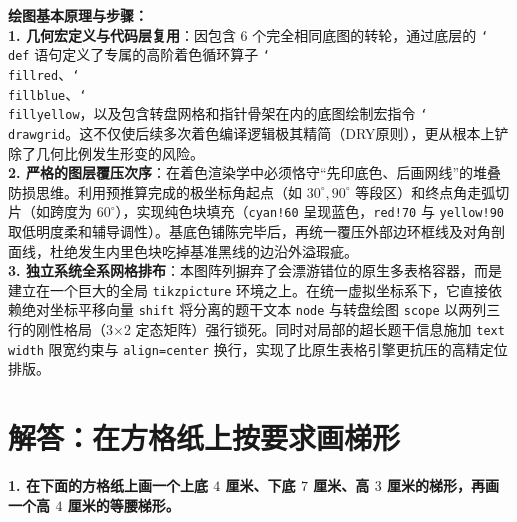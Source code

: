 \documentclass[12pt, a4paper]{ctexrep}
\begin{document}
\vspace{0.6cm}

{\small\color{blue!70!black}
\textbf{绘图基本原理与步骤：}\\
\textbf{1. 几何宏定义与代码层复用}：因包含 $6$ 个完全相同底图的转轮，通过底层的 \texttt{\char`\\def} 语句定义了专属的高阶着色循环算子 \texttt{\char`\\fillred}、\texttt{\char`\\fillblue}、\texttt{\char`\\fillyellow}，以及包含转盘网格和指针骨架在内的底图绘制宏指令 \texttt{\char`\\drawgrid}。这不仅使后续多次着色编译逻辑极其精简（DRY原则），更从根本上铲除了几何比例发生形变的风险。\\
\textbf{2. 严格的图层覆压次序}：在着色渲染学中必须恪守“先印底色、后画网线”的堆叠防损思维。利用预推算完成的极坐标角起点（如 $30^\circ, 90^\circ$ 等段区）和终点角走弧切片（如跨度为 $60^\circ$），实现纯色块填充（\texttt{cyan!60} 呈现蓝色，\texttt{red!70} 与 \texttt{yellow!90} 取低明度柔和辅导调性）。基底色铺陈完毕后，再统一覆压外部边环框线及对角剖面线，杜绝发生内里色块吃掉基准黑线的边沿外溢瑕疵。\\
\textbf{3. 独立系统全系网格排布}：本图阵列摒弃了会漂游错位的原生多表格容器，而是建立在一个巨大的全局 \texttt{tikzpicture} 环境之上。在统一虚拟坐标系下，它直接依赖绝对坐标平移向量 \texttt{shift} 将分离的题干文本 \texttt{node} 与转盘绘图 \texttt{scope} 以两列三行的刚性格局（3$\times$2 定态矩阵）强行锁死。同时对局部的超长题干信息施加 \texttt{text width} 限宽约束与 \texttt{align=center} 换行，实现了比原生表格引擎更抗压的高精定位排版。
}


\newpage

\section{解答：在方格纸上按要求画梯形}

\vspace{0.4cm}

\noindent\textbf{1. 在下面的方格纸上画一个上底 $4$ 厘米、下底 $7$ 厘米、高 $3$ 厘米的梯形，再画一个高 $4$ 厘米的等腰梯形。}

\vspace{0.8cm}
\end{document}
